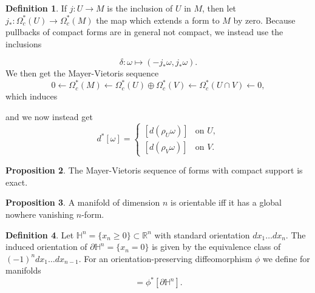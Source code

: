 \documentclass[twocolumn]{article}
\theoremstyle{definition}
\newtheorem{definition}{Definition}[section]
\newtheorem{proposition}[definition]{Proposition}
\theoremstyle{remark}
\begin{document}
\begin{definition}
    If $j: U \rightarrow M$ is the inclusion of $U$ in $M$, then let $j_*: \Omega^*_c(U) \rightarrow \Omega^*_c(M)$ the map which extends a form to $M$ by zero.
    Because pullbacks of compact forms are in general not compact, we instead use the inclusions
    \begin{center}
    \end{center}
    \begin{equation}
        \delta: \omega \mapsto (-j_*\omega, j_*\omega).
    \end{equation}
    We then get the Mayer-Vietoris sequence
    \begin{equation}
        0 \leftarrow \Omega^*_c(M) \leftarrow \Omega^*_c(U) \oplus \Omega^*_c(V) \leftarrow \Omega^*_c(U \cap V) \leftarrow 0,
    \end{equation}
    which induces
    \begin{center}
    \end{center}
    and we now instead get
    \begin{equation}
        d^*[\omega] = 
        \begin{cases}
            [d(\rho_U\omega)] & \textrm{on } U,\\
            [d(\rho_V\omega)] & \textrm{on } V.
        \end{cases}
    \end{equation}
\end{definition}
\begin{proposition}
    The Mayer-Vietoris sequence of forms with compact support is exact.
\end{proposition}
\begin{proposition}
    A manifold of dimension $n$ is orientable iff it has a global nowhere vanishing $n$-form.
\end{proposition}
\begin{definition}
    Let $\mathbb{H}^n = \{x_n \geq 0 \} \subset \mathbb{R}^n$ with standard orientation $dx_1\dots dx_n$.
    The induced orientation of $\partial \mathbb{H}^n = \{x_n=0\}$ is given by the equivalence class of $(-1)^n dx_1 \dots dx_{n-1}$.
    For an orientation-preserving diffeomorphism $\phi$ we define for manifolds
    \begin{equation}
        [\partial M] = \phi^*[\partial \mathbb{H}^n].
    \end{equation}
\end{definition}
\end{document}
